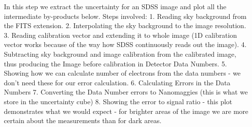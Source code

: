 In this step we extract the uncertainty for an SDSS image and plot all
the intermediate by-products below. Steps involved: 1. Reading sky
background from the FITS extension. 2. Interpolating the sky background
to the image resolution. 3. Reading calibration vector and extending it
to whole image (1D calibration vector works because of the way how SDSS
continuously reads out the image). 4. Subtracting sky background and
image calibration from the calibrated image, thus producing the Image
before calibration in Detector Data Numbers. 5. Showing how we can
calculate number of electrons from the data numbers - we don't need
these for our error calculation. 6. Calculating Errors in the Data
Numbers 7. Converting the Data Number errors to Nanomaggies (this is
what we store in the uncertainty cube) 8. Showing the error to signal
ratio - this plot demonstrates what we would expect - for brighter areas
of the image we are more certain about the measurements than for dark
areas.


